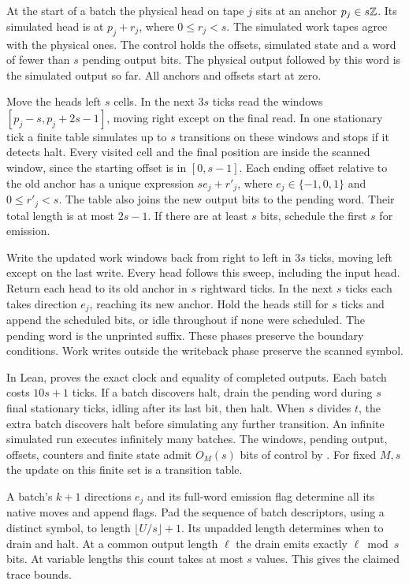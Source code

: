 \begin{outline}
At the start of a batch the physical head on tape $j$ sits at an anchor $p_j\in s\mathbb{Z}$. Its simulated head is at $p_j+r_j$, where $0\le r_j<s$. The simulated work tapes agree with the physical ones. The control holds the offsets, simulated state and a word of fewer than $s$ pending output bits. The physical output followed by this word is the simulated output so far. All anchors and offsets start at zero.

Move the heads left $s$ cells. In the next $3s$ ticks read the windows $[p_j-s,p_j+2s-1]$, moving right except on the final read. In one stationary tick a finite table simulates up to $s$ transitions on these windows and stops if it detects halt. Every visited cell and the final position are inside the scanned window, since the starting offset is in $[0,s-1]$. Each ending offset relative to the old anchor has a unique expression $se_j+r'_j$, where $e_j\in\{-1,0,1\}$ and $0\le r'_j<s$. The table also joins the new output bits to the pending word. Their total length is at most $2s-1$. If there are at least $s$ bits, schedule the first $s$ for emission.

Write the updated work windows back from right to left in $3s$ ticks, moving left except on the last write. Every head follows this sweep, including the input head. Return each head to its old anchor in $s$ rightward ticks. In the next $s$ ticks each takes direction $e_j$, reaching its new anchor. Hold the heads still for $s$ ticks and append the scheduled bits, or idle throughout if none were scheduled. The pending word is the unprinted suffix. These phases preserve the boundary conditions. Work writes outside the writeback phase preserve the scanned symbol.

In Lean,  proves the exact clock and equality of completed outputs. Each batch costs $10s+1$ ticks. If a batch discovers halt, drain the pending word during $s$ final stationary ticks, idling after its last bit, then halt. When $s$ divides $t$, the extra batch discovers halt before simulating any further transition. An infinite simulated run executes infinitely many batches. The windows, pending output, offsets, counters and finite state admit $O_M(s)$ bits of control by . For fixed $M,s$ the update on this finite set is a transition table.

A batch's $k+1$ directions $e_j$ and its full-word emission flag determine all its native moves and append flags. Pad the sequence of batch descriptors, using a distinct symbol, to length $\lfloor U/s\rfloor+1$. Its unpadded length determines when to drain and halt. At a common output length $\ell$ the drain emits exactly $\ell\bmod s$ bits. At variable lengths this count takes at most $s$ values. This gives the claimed trace bounds.
\end{outline}


